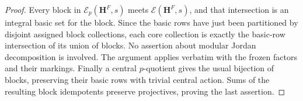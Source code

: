 \begin{proof}
Every block in $\mathcal E_p(\mathbf H^F,s)$ meets
$\mathcal E(\mathbf H^F,s)$, and that intersection
is an integral basic set for the block.  Since the
basic rows have just been partitioned by disjoint
assigned block collections, each core collection
is exactly the basic-row intersection of its union
of blocks.  No assertion about modular Jordan
decomposition is involved.  The argument applies
verbatim with the frozen factors and their markings.
Finally a central $p$-quotient gives the usual
bijection of blocks, preserving their basic rows
with trivial central action.  Sums of the resulting
block idempotents preserve projectives, proving
the last assertion.
\end{proof}
